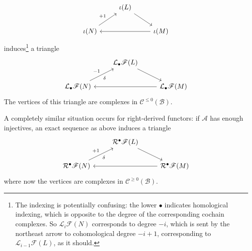 \[\begin{tikzcd}
&\iota(L)\ar[rd]&\\
\iota(N)\ar[ru,"+1"]&&\iota(M)\ar[ll]
\end{tikzcd}\]
induces\footnote{The indexing is potentially confusing: the lower $\bullet$ indicates homological indexing, which is opposite to the degree of the corresponding cochain complexes. So $\mathcal{L}_{i}\mathscr{F}(N)$ corresponds to degree $-i$, which is sent by the northeast arrow to cohomological degree $-i+1$, corresponding to $\mathcal{L}_{i-1}\mathscr{F}(L)$, as it should.} a triangle
\[\begin{tikzcd}
&\mathcal{L}_{\bullet}\mathscr{F}(L)\ar[rd]&\\
\mathcal{L}_{\bullet}\mathscr{F}(N)\ar[ru,"-1","\delta"']&&\mathcal{L}_{\bullet}\mathscr{F}(M)\ar[ll]
\end{tikzcd}\]
The vertices of this triangle are complexes in $\mathcal{C}^{\leq0}(\mathcal{B})$.\par
A completely similar situation occurs for right-derived functors: if $\mathcal{A}$ has enough
injectives, an exact sequence as above induces a triangle
\[\begin{tikzcd}
&\mathcal{R}^{\bullet}\mathscr{F}(L)\ar[rd]&\\
\mathcal{R}^{\bullet}\mathscr{F}(N)\ar[ru,"+1","\delta"']&&\mathcal{R}^{\bullet}\mathscr{F}(M)\ar[ll]
\end{tikzcd}\]
where now the vertices are complexes in $\mathcal{C}^{\geq0}(\mathcal{B})$.
